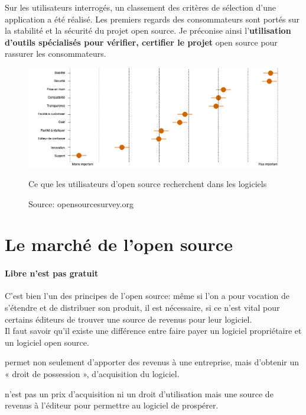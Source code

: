 				 Sur les utilisateurs interrogés, un classement des critères de sélection d'une application a été réalisé. Les premiers regards des consommateurs sont portés sur la stabilité et la sécurité du projet open source. Je préconise ainsi l'\textbf{utilisation d'outils spécialisés pour vérifier, certifier le projet} open source pour rassurer les consommateurs.

				\begin{figure}[!htb]
					\center
					\includegraphics[scale=0.50]{./img/value_soft_os.png}
					\caption{Ce que les utilisateurs d'open source recherchent dans les logiciels}
   					\caption*{\color{silver}Source: opensourcesurvey.org}
				\end{figure}



	\section{Le marché de l'open source} %

		\paragraph{Libre n'est pas gratuit \\} 

			C'est bien l'un des principes de l'open source: même si l'on a pour vocation de s'étendre et de distribuer son produit, il est nécessaire, si ce n'est vital pour certains éditeurs de trouver une source de revenus pour leur logiciel.\\
			Il faut savoir qu'il existe une différence entre faire payer un logiciel propriétaire et un logiciel open source. 
			\begin{description}[font=\color{burntorange}]
				\item [Payer un logiciel propriétaire : ] permet non seulement d'apporter des revenus à une entreprise, mais d'obtenir un « droit de possession », d'acquisition du logiciel.
				\item [Payer un logiciel open source : ] n'est pas un prix d'acquisition ni un droit d'utilisation mais une source de revenus à l'éditeur pour permettre au logiciel de prospérer.
			\end{description}

